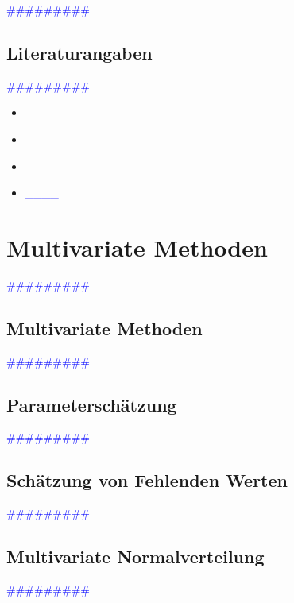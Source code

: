 \documentclass{article}
\begin{document}
      \textcolor{blue}{\#\#\#\#\#\#\#\#\#}
  \subsection{Literaturangaben} %

      \textcolor{blue}{\#\#\#\#\#\#\#\#\#}

      \begin{itemize}
      \color{red}
        \item  \textcolor{blue}{\_\_\_\_}
        \item  \textcolor{blue}{\_\_\_\_}
      \color{ForestGreen}
        \item  \textcolor{blue}{\_\_\_\_}
        \item  \textcolor{blue}{\_\_\_\_}
      \end{itemize}



\newpage
\section{Multivariate Methoden} %
      \textcolor{blue}{\#\#\#\#\#\#\#\#\#}
  \subsection{Multivariate Methoden} %
      \textcolor{blue}{\#\#\#\#\#\#\#\#\#}
  \subsection{Parameterschätzung} %
      \textcolor{blue}{\#\#\#\#\#\#\#\#\#}
  \subsection{Schätzung von Fehlenden Werten} %
      \textcolor{blue}{\#\#\#\#\#\#\#\#\#}
  \subsection{Multivariate Normalverteilung} %
      \textcolor{blue}{\#\#\#\#\#\#\#\#\#}
\end{document}
